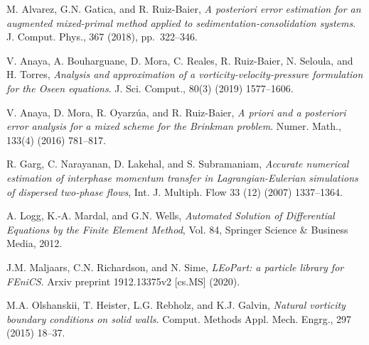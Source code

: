 \documentclass[10pt, a4paper]{article}
\begin{document}
\begin{thebibliography}{99}
\small

{\sc M. Alvarez, G.N. Gatica, and R. Ruiz-Baier},
{\it A posteriori error estimation for an augmented mixed-primal method applied to sedimentation-consolidation systems}. 
J. Comput. Phys., 367 (2018), pp.~322--346.

  {\sc V. Anaya, A. Bouharguane, D. Mora,
C. Reales, R. Ruiz-Baier, N. Seloula, and H. Torres},
{\it Analysis and approximation of a vorticity-velocity-pressure
formulation for the Oseen equations}. J. Sci. Comput., 80(3) (2019)  1577--1606.


 {\sc V. Anaya, D. Mora, R. Oyarz\'ua, and
  R. Ruiz-Baier}, {\it A priori and a posteriori error
  analysis for a mixed scheme for the Brinkman problem}.
  Numer. Math., 133(4) (2016) 781--817.

 {\sc R. Garg, C. Narayanan, D. Lakehal, and S. Subramaniam}, {\it Accurate numerical estimation of interphase momentum transfer in Lagrangian-Eulerian simulations of dispersed two-phase flows}, Int. J. Multiph. Flow 33 (12) (2007) 1337--1364.

 {\sc A. Logg, K.-A. Mardal, and G.N. Wells}, {\it Automated Solution of Differential Equations by the Finite Element Method}, Vol. 84, Springer Science \& Business Media, 2012. 

 {\sc J.M. Maljaars, C.N. Richardson, and N. Sime}, {\it LEoPart: a particle library for FEniCS}. Arxiv preprint 1912.13375v2 [cs.MS] (2020).  

     {{\sc M.A. Olshanskii, T. Heister, L.G. Rebholz, and K.J. Galvin}, {\it Natural vorticity boundary conditions on solid walls}. Comput. Methods Appl. Mech. Engrg., 297 (2015) 18--37.}

\end{thebibliography}
\end{document}

